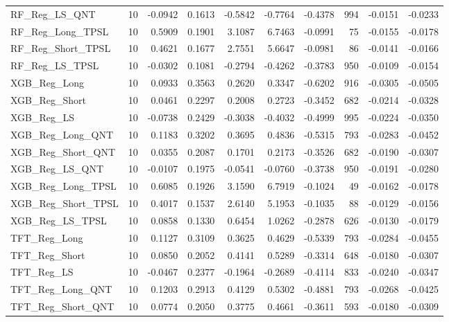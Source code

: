 \begin{tabular}{llrrrrrrrr}
\cline{1-10}
RF\_Reg\_LS\_QNT & 10 & -0.0942 & 0.1613 & -0.5842 & -0.7764 & -0.4378 & 994 & -0.0151 & -0.0233 \\
\cline{1-10}
RF\_Reg\_Long\_TPSL & 10 & 0.5909 & 0.1901 & 3.1087 & 6.7463 & -0.0991 & 75 & -0.0155 & -0.0178 \\
\cline{1-10}
RF\_Reg\_Short\_TPSL & 10 & 0.4621 & 0.1677 & 2.7551 & 5.6647 & -0.0981 & 86 & -0.0141 & -0.0166 \\
\cline{1-10}
RF\_Reg\_LS\_TPSL & 10 & -0.0302 & 0.1081 & -0.2794 & -0.4262 & -0.3783 & 950 & -0.0109 & -0.0154 \\
\cline{1-10}
XGB\_Reg\_Long & 10 & 0.0933 & 0.3563 & 0.2620 & 0.3347 & -0.6202 & 916 & -0.0305 & -0.0505 \\
\cline{1-10}
XGB\_Reg\_Short & 10 & 0.0461 & 0.2297 & 0.2008 & 0.2723 & -0.3452 & 682 & -0.0214 & -0.0328 \\
\cline{1-10}
XGB\_Reg\_LS & 10 & -0.0738 & 0.2429 & -0.3038 & -0.4032 & -0.4999 & 995 & -0.0224 & -0.0350 \\
\cline{1-10}
XGB\_Reg\_Long\_QNT & 10 & 0.1183 & 0.3202 & 0.3695 & 0.4836 & -0.5315 & 793 & -0.0283 & -0.0452 \\
\cline{1-10}
XGB\_Reg\_Short\_QNT & 10 & 0.0355 & 0.2087 & 0.1701 & 0.2173 & -0.3526 & 682 & -0.0190 & -0.0307 \\
\cline{1-10}
XGB\_Reg\_LS\_QNT & 10 & -0.0107 & 0.1975 & -0.0541 & -0.0760 & -0.3738 & 950 & -0.0191 & -0.0280 \\
\cline{1-10}
XGB\_Reg\_Long\_TPSL & 10 & 0.6085 & 0.1926 & 3.1590 & 6.7919 & -0.1024 & 49 & -0.0162 & -0.0178 \\
\cline{1-10}
XGB\_Reg\_Short\_TPSL & 10 & 0.4017 & 0.1537 & 2.6140 & 5.1953 & -0.1035 & 88 & -0.0129 & -0.0156 \\
\cline{1-10}
XGB\_Reg\_LS\_TPSL & 10 & 0.0858 & 0.1330 & 0.6454 & 1.0262 & -0.2878 & 626 & -0.0130 & -0.0179 \\
\cline{1-10}
TFT\_Reg\_Long & 10 & 0.1127 & 0.3109 & 0.3625 & 0.4629 & -0.5339 & 793 & -0.0284 & -0.0455 \\
\cline{1-10}
TFT\_Reg\_Short & 10 & 0.0850 & 0.2052 & 0.4141 & 0.5289 & -0.3314 & 648 & -0.0180 & -0.0307 \\
\cline{1-10}
TFT\_Reg\_LS & 10 & -0.0467 & 0.2377 & -0.1964 & -0.2689 & -0.4114 & 833 & -0.0240 & -0.0347 \\
\cline{1-10}
TFT\_Reg\_Long\_QNT & 10 & 0.1203 & 0.2913 & 0.4129 & 0.5302 & -0.4881 & 793 & -0.0268 & -0.0425 \\
\cline{1-10}
TFT\_Reg\_Short\_QNT & 10 & 0.0774 & 0.2050 & 0.3775 & 0.4661 & -0.3611 & 593 & -0.0180 & -0.0309 \\

\end{tabular}
